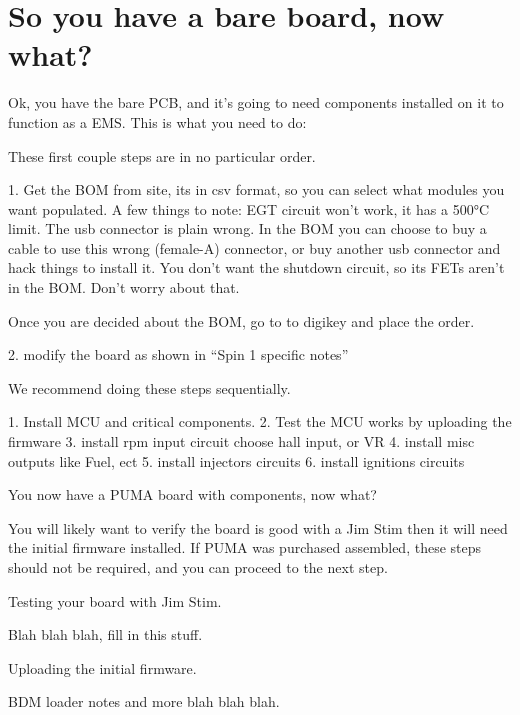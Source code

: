 \section{So you have a bare board, now what?}

Ok, you have the bare PCB, and it's going to need components installed on it to function as a EMS. This is what you need to do:

These first couple steps are in no particular order.

1. Get the BOM from site, its in csv format, so you can select what modules you want populated.
A few things to note:
EGT circuit won't work, it has a 500°C limit.
The usb connector is plain wrong. In the BOM you can choose to buy a cable to use this wrong (female-A) connector, or buy another usb connector and hack things to install it.
You don't want the shutdown circuit, so its FETs aren't in the BOM. Don't worry about that.

Once you are decided about the BOM, go to to digikey and place the order.

2. modify the board as shown in “Spin 1 specific notes”

We recommend doing these steps sequentially.

1. Install MCU and critical components.
2. Test the MCU works by uploading the firmware
3. install rpm input circuit choose hall input, or VR
4. install misc outputs like Fuel, ect
5. install injectors circuits
6. install ignitions circuits

You now have a PUMA board with components, now what?

You will likely want to verify the board is good with a Jim Stim  then it will need the initial firmware installed. If PUMA was purchased assembled, these steps should not be required, and you can proceed to the next step.

	Testing your board with Jim Stim.

Blah blah blah, fill in this stuff.

	Uploading the initial firmware.

BDM loader notes and more blah blah blah. 
 